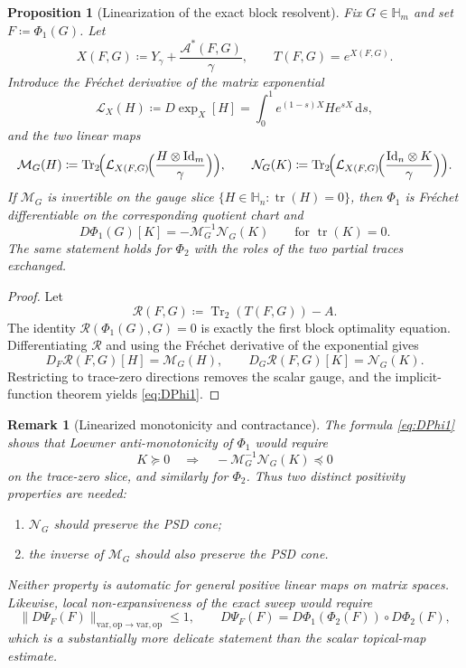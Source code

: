 \documentclass[11pt]{article}
\newcommand{\Id}{\mathrm{Id}}
\newcommand{\tr}{\operatorname{tr}}
\newcommand{\Trtwo}{\operatorname{Tr}_{2}}
\newcommand{\eqdef}{\coloneqq}
\newcommand{\Hh}{\mathbb{H}}
\newcommand{\Aa}{\mathcal{A}}
\newcommand{\op}{\mathrm{op}}
\newcommand{\varop}{\mathrm{var},\op}
\theoremstyle{plain}
\newtheorem{proposition}{Proposition}[section]
\newtheorem{remark}{Remark}[section]
\begin{document}
\begin{proposition}[Linearization of the exact block resolvent]
\label{prop:qot-phi-linearization}
Fix $G \in \Hh_m$ and set $F\eqdef \Phi_1(G)$.
Let
\[
X(F,G)\eqdef Y_\gamma + \frac{\Aa^\ast(F,G)}{\gamma},
\qquad
T(F,G)=e^{X(F,G)}.
\]
Introduce the Fr\'echet derivative of the matrix exponential
\[
\mathcal L_{X}(H)
\eqdef
D\!\exp_X[H]
=
\int_0^1 e^{(1-s)X} H e^{sX}\,\mathrm ds,
\]
and the two linear maps
\[
\mathcal M_G(H)
\eqdef
\Trtwo\!\Bigl(\mathcal L_{X(F,G)}\!\Bigl(\frac{H \otimes \Id_m}{\gamma}\Bigr)\Bigr),
\qquad
\mathcal N_G(K)
\eqdef
\Trtwo\!\Bigl(\mathcal L_{X(F,G)}\!\Bigl(\frac{\Id_n \otimes K}{\gamma}\Bigr)\Bigr).
\]
If $\mathcal M_G$ is invertible on the gauge slice $\{H \in \Hh_n : \tr(H)=0\}$, then $\Phi_1$ is Fr\'echet differentiable on the corresponding quotient chart and
\begin{equation}
\label{eq:DPhi1}
D\Phi_1(G)[K]
=
-\mathcal M_G^{-1}\mathcal N_G(K)
\qquad \text{for } \tr(K)=0.
\end{equation}
The same statement holds for $\Phi_2$ with the roles of the two partial traces exchanged.
\end{proposition}

\begin{proof}
Let
\[
\mathcal R(F,G)\eqdef \Trtwo(T(F,G))-A.
\]
The identity $\mathcal R(\Phi_1(G),G)=0$ is exactly the first block optimality equation.
Differentiating $\mathcal R$ and using the Fr\'echet derivative of the exponential gives
\[
D_F \mathcal R(F,G)[H]=\mathcal M_G(H),
\qquad
D_G \mathcal R(F,G)[K]=\mathcal N_G(K).
\]
Restricting to trace-zero directions removes the scalar gauge, and the implicit-function theorem yields \eqref{eq:DPhi1}.
\end{proof}

\begin{remark}[Linearized monotonicity and contractance]
\label{rem:qot-linearized-obstacle}
The formula \eqref{eq:DPhi1} shows that Loewner anti-monotonicity of $\Phi_1$ would require
\[
K \succeq 0
\quad\Longrightarrow\quad
-\mathcal M_G^{-1}\mathcal N_G(K) \preceq 0
\]
on the trace-zero slice, and similarly for $\Phi_2$.
Thus two distinct positivity properties are needed:
\begin{enumerate}[label=\textnormal{(\roman*)}]
\item $\mathcal N_G$ should preserve the PSD cone;
\item the inverse of $\mathcal M_G$ should also preserve the PSD cone.
\end{enumerate}
Neither property is automatic for general positive linear maps on matrix spaces.
Likewise, local non-expansiveness of the exact sweep would require
\[
\|D\Psi_F(F)\|_{\varop \to \varop}\le 1,
\qquad
D\Psi_F(F)=D\Phi_1(\Phi_2(F)) \circ D\Phi_2(F),
\]
which is a substantially more delicate statement than the scalar topical-map estimate.
\end{remark}
\end{document}

